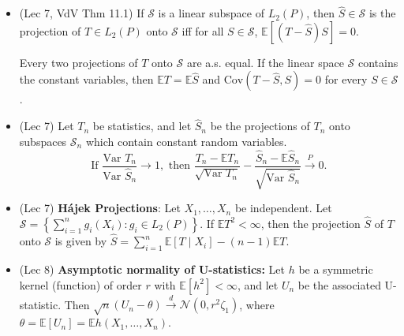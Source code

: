 \documentclass[twoside]{article}
\newcommand{\dis}{\displaystyle}
\newcommand\bbE{\mathbb{E}}
\newcommand\calN{\mathcal{N}}
\newcommand\cd{\stackrel{d}{\goesto}}
\newcommand\cp{\stackrel{P}{\goesto}}
\newcommand\goesto{\rightarrow}
\newcommand\var{\text{Var }}
\begin{document}
\begin{itemize}
\item (Lec 7, VdV Thm 11.1) If $\mathcal{S}$ is a linear subspace of $L_2(P)$, then $\hat{S} \in \mathcal{S}$ is the projection of $T \in L_2(P)$ onto $\mathcal{S}$ iff for all $S \in \mathcal{S}$, $\bbE [(T - \hat{S})S] = 0$.

Every two projections of $T$ onto $\mathcal{S}$ are a.s. equal. If the linear space $\mathcal{S}$ contains the constant variables, then $\bbE T = \bbE \hat{S}$ and $\text{Cov}(T - \hat{S}, S) = 0$ for every $S \in \mathcal{S}$.

\item (Lec 7) Let $T_n$ be statistics, and let $\hat{S}_n$ be the projections of $T_n$ onto subspaces $\mathcal{S}_n$ which contain constant random variables.
\begin{equation*}
\text{If } \dis\frac{\var T_n}{\var \hat{S}_n} \goesto 1, \text{ then } \frac{T_n - \bbE T_n}{\sqrt{\var T_n}} - \frac{\hat{S}_n - \bbE \hat{S}_n}{\sqrt{\var \hat{S}_n}} \cp 0.
\end{equation*}

\item (Lec 7) \textbf{H\'{a}jek Projections}: Let $X_1, \dots, X_n$ be independent. Let $\mathcal{S} = \left\{ \dis\sum_{i=1}^n g_i(X_i): g_i \in L_2(P) \right\}$. If $\bbE T^2 < \infty$, then the projection $\hat{S}$ of $T$ onto $\mathcal{S}$ is given by $\hat{S} = \dis\sum_{i = 1}^n \bbE [T \mid X_i] - (n-1) \bbE T$.

\item (Lec 8) \textbf{Asymptotic normality of U-statistics:} Let $h$ be a symmetric kernel (function) of order $r$ with $\bbE [h^2] <\infty$, and let $U_n$ be the associated U-statistic. Then $\sqrt{n}(U_n- \theta) \cd \calN(0,r^2 \zeta_1)$, where $\theta = \bbE [U_n] = \bbE h(X_1,\dots,X_n)$.

\end{itemize}

\end{document}
